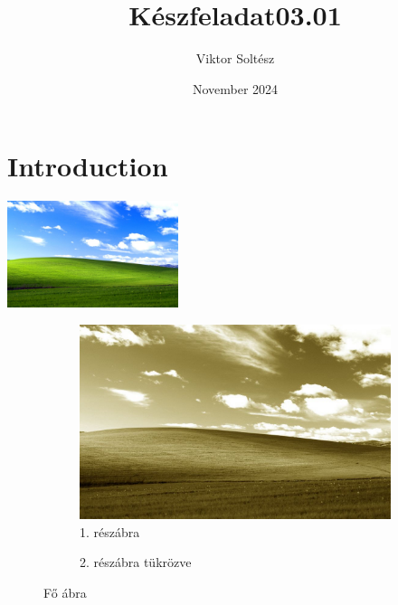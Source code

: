 \documentclass{article}
\title{Készfeladat03.01}
\author{Viktor Soltész}
\date{November 2024}
\begin{document}
\maketitle

\section{Introduction}
\listoffigures
\listoftables
\hulipsum
\includegraphics[keepaspectratio,width=5cm]{szines.jpg}
\hulipsum[2-5]

\begin{figure}
    \centering
    \begin{subfigure}[t]{0.45\linewidth}
        \centering
        \includegraphics[width=\linewidth]{szepia.jpg}
        \caption{1. részábra}
        \label{fig:subfig1}
    \end{subfigure}
    \begin{subfigure}[t]{0.45\linewidth}
        \centering
        \caption{2. részábra tükrözve}
        \label{fig:subfig2}
    \end{subfigure}
    
    \caption{Fő ábra}
    \label{fig:mainfigure}
\end{figure}
\hulipsum[2-5]
\end{document}
